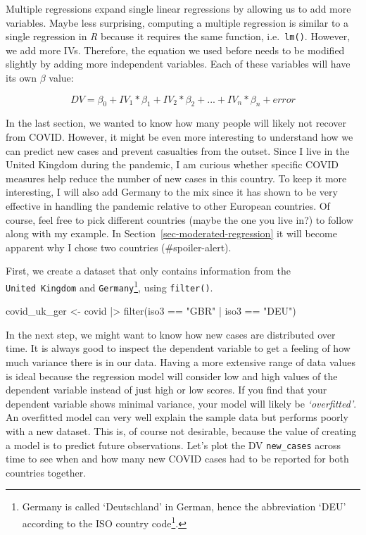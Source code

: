 \documentclass[
  letterpaper,
]{krantz}
\makeatletter
\newenvironment{Shaded}{\begin{snugshade}}{\end{snugshade}}
\newcommand{\FunctionTok}[1]{\textcolor[rgb]{0.28,0.35,0.67}{#1}}
\newcommand{\NormalTok}[1]{\textcolor[rgb]{0.00,0.23,0.31}{#1}}
\newcommand{\OtherTok}[1]{\textcolor[rgb]{0.00,0.23,0.31}{#1}}
\newcommand{\SpecialCharTok}[1]{\textcolor[rgb]{0.37,0.37,0.37}{#1}}
\newcommand{\StringTok}[1]{\textcolor[rgb]{0.13,0.47,0.30}{#1}}
\renewcommand{\href}[2]{#2\footnote{\url{#1}}}
\newenvironment{kframe}{%
\medskip{}
\setlength{\fboxsep}{.8em}
 \def\at@end@of@kframe{}%
 \ifinner\ifhmode%
  \def\at@end@of@kframe{\end{minipage}}%
  \begin{minipage}{\columnwidth}%
 \fi\fi%
 \def\FrameCommand##1{\hskip\@totalleftmargin \hskip-\fboxsep
 \colorbox{shadecolor}{##1}\hskip-\fboxsep
     \hskip-\linewidth \hskip-\@totalleftmargin \hskip\columnwidth}%
 \MakeFramed {\advance\hsize-\width
   \@totalleftmargin\z@ \linewidth\hsize
   \@setminipage}}%
 {\par\unskip\endMakeFramed%
 \at@end@of@kframe}
\renewenvironment{Shaded}{\begin{kframe}}{\end{kframe}}
\makeatother
\begin{document}
Multiple regressions expand single linear regressions by allowing us to
add more variables. Maybe less surprising, computing a multiple
regression is similar to a single regression in \emph{R} because it
requires the same function, i.e.~\texttt{lm()}. However, we add more
IVs. Therefore, the equation we used before needs to be modified
slightly by adding more independent variables. Each of these variables
will have its own \(\beta\) value:

\[
DV = \beta_{0} + IV_{1} * \beta_{1} + IV_{2} * \beta_{2} + ... + IV_{n} * \beta_{n} + error
\]

In the last section, we wanted to know how many people will likely not
recover from COVID. However, it might be even more interesting to
understand how we can predict new cases and prevent casualties from the
outset. Since I live in the United Kingdom during the pandemic, I am
curious whether specific COVID measures help reduce the number of new
cases in this country. To keep it more interesting, I will also add
Germany to the mix since it has shown to be very effective in handling
the pandemic relative to other European countries. Of course, feel free
to pick different countries (maybe the one you live in?) to follow along
with my example. In Section~\ref{sec-moderated-regression} it will
become apparent why I chose two countries (\#spoiler-alert).

First, we create a dataset that only contains information from the
\texttt{United\ Kingdom} and \texttt{Germany}\footnote{Germany is called
  `Deutschland' in German, hence the abbreviation `DEU' according to the
  \href{https://www.iso.org/obp/ui/\#iso:code:3166:DE}{ISO country
  code}.}, using \texttt{filter()}.

\begin{Shaded}
\begin{Highlighting}[]
\NormalTok{covid\_uk\_ger }\OtherTok{\textless{}{-}}
\NormalTok{  covid }\SpecialCharTok{|\textgreater{}}
  \FunctionTok{filter}\NormalTok{(iso3 }\SpecialCharTok{==} \StringTok{"GBR"} \SpecialCharTok{|}\NormalTok{ iso3 }\SpecialCharTok{==} \StringTok{"DEU"}\NormalTok{)}
\end{Highlighting}
\end{Shaded}

In the next step, we might want to know how new cases are distributed
over time. It is always good to inspect the dependent variable to get a
feeling of how much variance there is in our data. Having a more
extensive range of data values is ideal because the regression model
will consider low and high values of the dependent variable instead of
just high or low scores. If you find that your dependent variable shows
minimal variance, your model will likely be \emph{`overfitted'}. An
overfitted model can very well explain the sample data but performs
poorly with a new dataset. This is, of course not desirable, because the
value of creating a model is to predict future observations. Let's plot
the DV \texttt{new\_cases} across time to see when and how many new
COVID cases had to be reported for both countries together.
\end{document}
